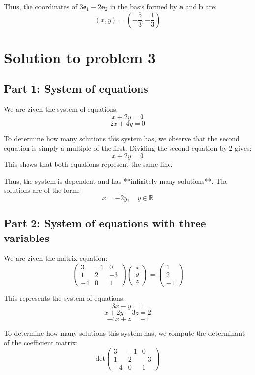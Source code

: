 \documentclass[11pt]{article}
\begin{document}
Thus, the coordinates of \( 3 \mathbf{e}_1 - 2 \mathbf{e}_2 \) in the basis formed by \( \mathbf{a} \) and \( \mathbf{b} \) are:
\[
\left( x, y \right) = \left( -\frac{5}{3}, -\frac{1}{3} \right)
\]




\newpage

\section{Solution to problem 3}

\subsection{Part 1: System of equations}

We are given the system of equations:
\[
x + 2y = 0
\]
\[
2x + 4y = 0
\]

To determine how many solutions this system has, we observe that the second equation is simply a multiple of the first. Dividing the second equation by 2 gives:
\[
x + 2y = 0
\]
This shows that both equations represent the same line.

Thus, the system is dependent and has **infinitely many solutions**. The solutions are of the form:
\[
x = -2y, \quad y \in \mathbb{R}
\]

\newpage

\subsection{Part 2: System of equations with three variables}

We are given the matrix equation:
\[
\begin{pmatrix}
3 & -1 & 0 \\
1 & 2 & -3 \\
-4 & 0 & 1
\end{pmatrix}
\begin{pmatrix} x \\ y \\ z \end{pmatrix}
=
\begin{pmatrix} 1 \\ 2 \\ -1 \end{pmatrix}
\]

This represents the system of equations:
\[
3x - y = 1
\]
\[
x + 2y - 3z = 2
\]
\[
-4x + z = -1
\]

To determine how many solutions this system has, we compute the determinant of the coefficient matrix:
\[
\text{det} \begin{pmatrix}
3 & -1 & 0 \\
1 & 2 & -3 \\
-4 & 0 & 1
\end{pmatrix}
\]
\end{document}
